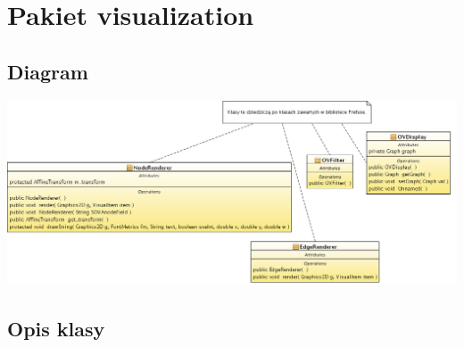 \documentclass[a4paper,10pt]{article}
\begin{document}
\begin{center}
\begin{longtable}{|m{3cm}|m{9cm}|}


\end{longtable}

\end{center}

\section{Pakiet visualization }

\subsection{Diagram}

\includegraphics[width=\linewidth]{./modelowanie/OV_UML/VisualizationClassDiagram.png}

\subsection{Opis klasy}
\end{document}
